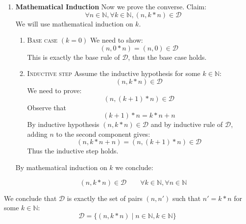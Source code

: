 \begin{solution}
\begin{enumerate}
By rule induction we can conclude 
\[(n,n')\in \mathcal{D} \implies \exists k \in \mathbb{N} . n'=k\ast n\]
\item \textbf{Mathematical Induction}
Now we prove the converse.
Claim:
\[\forall n \in \mathbb{N}, \forall k \in \mathbb{N}, (n, k\ast n) \in \mathcal{D}\]
We will use mathematical induction on $k$.
\begin{enumerate}
            \item \textsc{Base case $(k=0)$} We need to show:
\[(n,0\ast n)=(n,0)\in \mathcal{D}\]
This is exactly the base rule of $\mathcal{D}$, thus the base case holds.
            \item \textsc{Inductive step} 
            Assume the inductive hypothesis for some $k\in \mathbb{N}$: 
            \[(n, k\ast n) \in \mathcal{D}\]
            We need to prove: 
            \[(n, (k+1)\ast n) \in \mathcal{D}\]
            Observe that 
            \[(k+1) \ast n = k \ast n + n\]
            By inductive hypothesis $(n, k\ast n) \in \mathcal{D}$ and by inductive rule of $\mathcal{D}$, adding $n$ to the second component gives: 
            \[(n,k\ast n+n)=(n,(k+1)\ast n)\in\mathcal{D}\]
            Thus the inductive step holds.
\end{enumerate}
By mathematical induction on $k$ we conclude:

\[(n,k\ast n)\in\mathcal{D}  \qquad \forall k\in \mathbb{N},\forall n\in \mathbb{N}\]
\end{enumerate}
We conclude that $\mathcal{D}$ is exactly the set of pairs $(n,n')$ such that $n'=k\ast n$ for some $k\in\mathbb{N}$:
\[\mathcal{D}=\{(n,k\ast n)\mid n\in \mathbb{N},k\in \mathbb{N}\}\]
\end{solution}